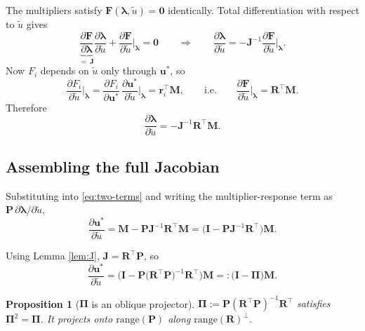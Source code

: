 \documentclass[11pt,a4paper]{article}
\newtheorem{proposition}{Proposition}
\theoremstyle{remark}
\newcommand{\ut}{\tilde{u}}
\newcommand{\us}{u^{*}}
\begin{document}
The multipliers satisfy $\bm{F}(\bm\lambda, \ut) = \bm{0}$ identically. Total
differentiation with respect to $\ut$ gives
\begin{equation}
\underbrace{\frac{\partial\bm{F}}{\partial\bm\lambda}}_{=\ \bm{J}}
\frac{\partial\bm\lambda}{\partial\ut}
+ \frac{\partial\bm{F}}{\partial\ut}\bigg|_{\bm\lambda} = \bm{0}
\qquad\Longrightarrow\qquad
\frac{\partial\bm\lambda}{\partial\ut}
= -\bm{J}^{-1}\frac{\partial\bm{F}}{\partial\ut}\bigg|_{\bm\lambda} .
\end{equation}
Now $F_i$ depends on $\ut$ only through $\bm{\us}$, so
\begin{equation}
\frac{\partial F_i}{\partial\ut}\bigg|_{\bm\lambda}
= \frac{\partial F_i}{\partial\bm{\us}}\,
  \frac{\partial\bm{\us}}{\partial\ut}\bigg|_{\bm\lambda}
= \bm{r}_i^\top\bm{M},
\qquad\text{i.e.}\qquad
\frac{\partial\bm{F}}{\partial\ut}\bigg|_{\bm\lambda} = \bm{R}^\top\bm{M} .
\end{equation}
Therefore
\begin{equation}
\frac{\partial\bm\lambda}{\partial\ut} = -\bm{J}^{-1}\bm{R}^\top\bm{M} .
\end{equation}

\subsection{Assembling the full Jacobian}

Substituting into \eqref{eq:two-terms} and writing the multiplier-response term
as $\bm{P}\,\partial\bm\lambda/\partial\ut$,
\begin{equation}
\frac{\partial\bm{\us}}{\partial\ut}
= \bm{M} - \bm{P}\bm{J}^{-1}\bm{R}^\top\bm{M}
= \Big(\bm{I} - \bm{P}\bm{J}^{-1}\bm{R}^\top\Big)\bm{M} .
\label{eq:full-jac}
\end{equation}

Using Lemma \ref{lem:J}, $\bm{J} = \bm{R}^\top\bm{P}$, so
\begin{equation}
\boxed{\
\frac{\partial\bm{\us}}{\partial\ut}
= \Big(\bm{I} - \bm{P}\big(\bm{R}^\top\bm{P}\big)^{-1}\bm{R}^\top\Big)\bm{M}
=: \big(\bm{I} - \bm\Pi\big)\bm{M} .
\ }
\end{equation}

\begin{proposition}[$\bm\Pi$ is an oblique projector]
$\bm\Pi := \bm{P}(\bm{R}^\top\bm{P})^{-1}\bm{R}^\top$ satisfies
$\bm\Pi^2 = \bm\Pi$. It projects onto $\mathrm{range}(\bm{P})$ along
$\mathrm{range}(\bm{R})^\perp$.
\end{proposition}
\end{document}
